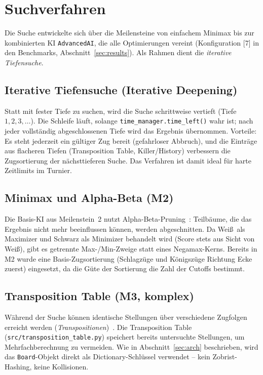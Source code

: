 \documentclass[11pt,a4paper]{article}
\newcommand{\code}[1]{\texttt{\small #1}}
\begin{document}
\section{Suchverfahren}\label{sec:search}
Die Suche entwickelte sich \"uber die Meilensteine von einfachem Minimax bis zur
kombinierten KI \code{AdvancedAI}, die alle Optimierungen vereint (Konfiguration
[7] in den Benchmarks, Abschnitt~\ref{sec:results}).
Als Rahmen dient die \emph{iterative Tiefensuche}.

\subsection{Iterative Tiefensuche (Iterative Deepening)}
Statt mit fester Tiefe zu suchen, wird die Suche schrittweise vertieft
(Tiefe $1,2,3,\dots$).
Die Schleife l\"auft, solange \code{time\_manager.time\_left()} wahr ist; nach
jeder vollst\"andig abgeschlossenen Tiefe wird das Ergebnis \"ubernommen.
Vorteile: Es steht jederzeit ein g\"ultiger Zug bereit (gefahrloser Abbruch),
und die Eintr\"age aus flacheren Tiefen (Transposition Table, Killer/History)
verbessern die Zugsortierung der n\"achsttieferen Suche.
Das Verfahren ist damit ideal f\"ur harte Zeitlimits im Turnier.

\subsection{Minimax und Alpha-Beta (M2)}
Die Basis-KI aus Meilenstein~2 nutzt Alpha-Beta-Pruning~\cite{russell2021}: Teilb\"aume, die das
Ergebnis nicht mehr beeinflussen k\"onnen, werden abgeschnitten.
Da Wei\ss\ als Maximizer und Schwarz als Minimizer behandelt wird (Score stets
aus Sicht von Wei\ss), gibt es getrennte Max-/Min-Zweige statt eines
Negamax-Kerns.
Bereits in M2 wurde eine Basis-Zugsortierung (Schlagz\"uge und K\"onigsz\"uge
Richtung Ecke zuerst) eingesetzt, da die G\"ute der Sortierung die Zahl der
Cutoffs bestimmt.

\subsection{Transposition Table (M3, komplex)}\label{sec:tt}
W\"ahrend der Suche k\"onnen identische Stellungen \"uber verschiedene Zugfolgen
erreicht werden (\emph{Transpositionen})~\cite{cpw}.
Die Transposition Table (\code{src/transposition\_table.py}) speichert bereits
untersuchte Stellungen, um Mehrfachberechnung zu vermeiden.
Wie in Abschnitt~\ref{sec:arch} beschrieben, wird das \code{Board}-Objekt direkt
als Dictionary-Schl\"ussel verwendet -- kein Zobrist-Hashing, keine Kollisionen.
\end{document}

